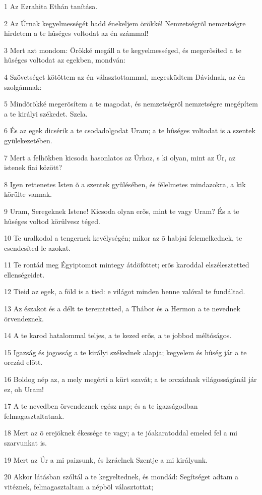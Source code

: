 \par 1 Az Ezrahita Ethán tanítása.
\par 2 Az Úrnak kegyelmességét hadd énekeljem örökké! Nemzetségrõl nemzetségre hirdetem a te hûséges voltodat az én számmal!
\par 3 Mert azt mondom: Örökké megáll a te kegyelmességed, és megerõsíted a te hûséges voltodat az egekben, mondván:
\par 4 Szövetséget kötöttem az én választottammal, megesküdtem Dávidnak, az én szolgámnak:
\par 5 Mindörökké megerõsítem a te magodat, és nemzetségrõl nemzetségre megépítem a te királyi székedet. Szela.
\par 6 És az egek dicsérik a te csodadolgodat Uram; a te hûséges voltodat is a szentek gyülekezetében.
\par 7 Mert a felhõkben kicsoda hasonlatos az Úrhoz, s ki olyan, mint az Úr, az istenek fiai között?
\par 8 Igen rettenetes Isten õ a szentek gyûlésében, és félelmetes mindazokra, a kik körülte vannak.
\par 9 Uram, Seregeknek Istene! Kicsoda olyan erõs, mint te vagy Uram? És a te hûséges voltod körülvesz téged.
\par 10 Te uralkodol a tengernek kevélységén; mikor az õ habjai felemelkednek, te csendesíted le azokat.
\par 11 Te rontád meg Égyiptomot mintegy átdöföttet; erõs karoddal elszélesztetted ellenségeidet.
\par 12 Tieid az egek, a föld is a tied: e világot minden benne valóval te fundáltad.
\par 13 Az északot és a délt te teremtetted, a Thábor és a Hermon a te nevednek örvendeznek.
\par 14 A te karod hatalommal teljes, a te kezed erõs, a te jobbod méltóságos.
\par 15 Igazság és jogosság a te királyi székednek alapja; kegyelem és hûség jár a te orczád elõtt.
\par 16 Boldog nép az, a mely megérti a kürt szavát; a te orczádnak világosságánál jár ez, oh Uram!
\par 17 A te nevedben örvendeznek egész nap; és a te igazságodban felmagasztaltatnak.
\par 18 Mert az õ erejöknek ékessége te vagy; a te jóakaratoddal emeled fel a mi szarvunkat is.
\par 19 Mert az Úr a mi paizsunk, és Izráelnek Szentje a mi királyunk.
\par 20 Akkor látásban szóltál a te kegyeltednek, és mondád: Segítséget adtam a vitéznek, felmagasztaltam a népbõl választottat;
